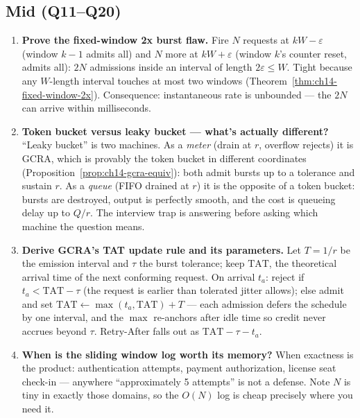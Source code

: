 \subsection*{Mid (Q11--Q20)}
\begin{enumerate}[label=\textbf{Q\arabic*.}, leftmargin=1.6cm, start=11]
  \item \textbf{Prove the fixed-window 2x burst flaw.}
        Fire $N$ requests at $kW - \varepsilon$ (window $k-1$ admits all)
        and $N$ more at $kW + \varepsilon$ (window $k$'s counter reset,
        admits all): $2N$ admissions inside an interval of length
        $2\varepsilon \le W$. Tight because any $W$-length interval touches
        at most two windows (Theorem~\ref{thm:ch14-fixed-window-2x}).
        Consequence: instantaneous rate is unbounded --- the $2N$ can
        arrive within milliseconds.
  \item \textbf{Token bucket versus leaky bucket --- what's actually
        different?}
        ``Leaky bucket'' is two machines. As a \emph{meter} (drain at $r$,
        overflow rejects) it is GCRA, which is provably the token bucket in
        different coordinates (Proposition~\ref{prop:ch14-gcra-equiv}): both
        admit bursts up to a tolerance and sustain $r$. As a \emph{queue}
        (FIFO drained at $r$) it is the opposite of a token bucket: bursts
        are destroyed, output is perfectly smooth, and the cost is queueing
        delay up to $Q/r$. The interview trap is answering before asking
        which machine the question means.
  \item \textbf{Derive GCRA's TAT update rule and its parameters.}
        Let $T = 1/r$ be the emission interval and $\tau$ the burst
        tolerance; keep $\mathrm{TAT}$, the theoretical arrival time of the
        next conforming request. On arrival $t_a$: reject if
        $t_a < \mathrm{TAT} - \tau$ (the request is earlier than tolerated
        jitter allows); else admit and set
        $\mathrm{TAT} \leftarrow \max(t_a, \mathrm{TAT}) + T$ --- each
        admission defers the schedule by one interval, and the $\max$
        re-anchors after idle time so credit never accrues beyond $\tau$.
        Retry-After falls out as $\mathrm{TAT} - \tau - t_a$.
  \item \textbf{When is the sliding window log worth its memory?}
        When exactness is the product: authentication attempts, payment
        authorization, license seat check-in --- anywhere ``approximately 5
        attempts'' is not a defense. Note $N$ is tiny in exactly those
        domains, so the $O(N)$ log is cheap precisely where you need it.

\end{enumerate}
